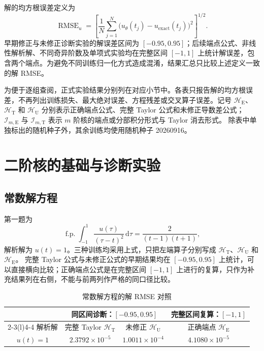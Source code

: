 \documentclass[UTF8,fontset=none,11pt,a4paper]{ctexart}
\newcommand{\rms}{\operatorname{RMSE}}
\newcommand{\best}[1]{\cellcolor{gray!15}\textbf{#1}}
\begin{document}
解的均方根误差定义为
\begin{equation}
\rms_u=\left[\frac1N\sum_{j=1}^{N}
\bigl(u_{\theta}(t_j)-u_{\mathrm{exact}}(t_j)\bigr)^2\right]^{1/2}.
\end{equation}
早期修正与未修正诊断实验的解误差区间为 $[-0.95,0.95]$；后续端点公式、非线性解析解、不同奇异阶数及单项式实验均在完整区间 $[-1,1]$ 上统计解误差，包含两个端点。为避免不同训练归一化方式造成混淆，结果汇总只比较上述定义一致的解 RMSE。

为便于逐组查阅，正式实验结果分别列在对应小节中。各表只报告解的均方根误差，不再列出训练损失、最大绝对误差、方程残差或交叉算子误差。记号
$\mathcal H_{\mathrm E}$、$\mathcal H_{\mathrm T}$ 和 $\mathcal H_{\mathrm U}$
分别表示正确端点公式、完整 Taylor 公式和未修正导数差公式；
$\mathcal I_{m,\mathrm E}$ 与 $\mathcal I_{m,\mathrm T}$ 表示 $m$ 阶核的端点或分部积分形式与 Taylor 消去形式。
除表中单独标出的随机种子外，其余训练均使用随机种子 20260916。


\section{二阶核的基础与诊断实验}

\subsection{常数解方程}

第一题为
\begin{equation}
\operatorname{f.p.}\!\int_{-1}^{1}
\frac{u(\tau)}{(\tau-t)^2}\,\mathrm d\tau
=\frac{2}{(t-1)(t+1)},
\end{equation}
解析解为 $u(t)=1$。三种训练均采用上式，只把左端算子分别写成
$\mathcal H_{\mathrm T}$、$\mathcal H_{\mathrm U}$ 和 $\mathcal H_{\mathrm E}$。
完整 Taylor 公式与未修正公式的早期结果均在 $[-0.95,0.95]$ 上统计，可以直接横向比较；正确端点公式是在完整区间 $[-1,1]$ 上进行的复算，只作为补充结果列在右侧，不能与前两列作严格的同口径比较。

\begin{table}[H]
\centering
\caption{常数解方程的解 RMSE 对照}
\label{tab:constant_results}
\begin{tabular}{cccc}
\toprule
& \multicolumn{2}{c}{同区间诊断：$[-0.95,0.95]$} & 完整区间复算：$[-1,1]$\\
\cmidrule(lr){2-3}\cmidrule(l){4-4}
解析解 & 完整 Taylor $\mathcal H_{\mathrm T}$ & 未修正 $\mathcal H_{\mathrm U}$ & 正确端点 $\mathcal H_{\mathrm E}$\\
\midrule
$u(t)=1$ & \best{$2.3792\times10^{-5}$} & $1.0011\times10^{-4}$ & $4.1080\times10^{-5}$\\
\bottomrule
\end{tabular}
\end{table}
\end{document}
